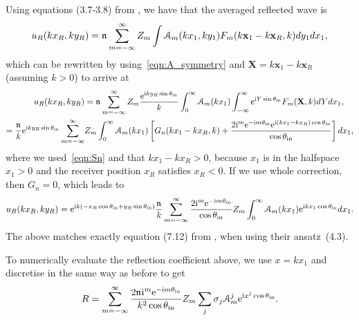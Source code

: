 \documentclass[12pt, a4paper]{article}
\begin{document}
Using equations (3.7-3.8) from \cite{gower_reflection_2018}, we have that the averaged reflected wave is
\begin{equation}
  u_R(kx_R,ky_R) = \mathfrak n_{} \sum_{m=-\infty}^\infty Z_m \int \mathcal A_m(kx_1,ky_1) F_m(k\mathbf x_1 - k\mathbf x_R,k) dy_1 dx_1,
\end{equation}
which can be rewritten by using~\eqref{eqn:A_symmetry} and $\mathbf X = k\mathbf x_1 - k\mathbf x_R$ (assuming $k>0$) to arrive at
\begin{align}
  u_R(kx_R,ky_R) &= \mathfrak n_{} \sum_{m=-\infty}^\infty Z_m \frac{\textrm{e}^{ \textrm{i} k y_R \sin \theta_{\mathrm{in}}}}{k} \int_{0}^\infty \mathcal A_m(kx_1) \int_{-\infty}^\infty \textrm{e}^{ \textrm{i} Y \sin \theta_{\mathrm{in}}} F_m(\mathbf X,k) dY dx_1,
  \\ \notag
   =  \frac{\mathfrak n_{}}{k} \textrm{e}^{ \textrm{i} k y_R \sin \theta_{\mathrm{in}}} \sum_{m=-\infty}^\infty &Z_m \int_{0}^\infty \mathcal A_m(kx_1) \left [ G_n(kx_1 - k x_R, k) + \frac{2 \textrm{i}^m \textrm{e}^{-\textrm{i} m \theta_{\mathrm{in}}} \textrm{e}^{\textrm{i} (kx_1 - k x_R) \cos \theta_{\mathrm{in}}}}{\cos \theta_{\mathrm{in}}} \right] d x_1,
\end{align}
where we used~\eqref{eqn:Sn} and that $kx_1 - k x_R > 0$, because $x_1$ is in the halfspace $x_1 >0$ and the receiver position $x_R$ satisfies $x_R<0$. If we use whole correction, then $G_n = 0$, which leads to
\begin{equation}
  u_R(kx_R,ky_R) =   \textrm{e}^{ \textrm{i} k ( - x_R \cos \theta_{\mathrm{in}} + y_R \sin \theta_{\mathrm{in}} )} \frac{\mathfrak n_{}}{k} \sum_{m=-\infty}^\infty \frac{2 \textrm{i}^m \textrm{e}^{-\textrm{i} m \theta_{\mathrm{in}}}}{\cos \theta_{\mathrm{in}}} Z_m  \int_{0}^\infty \mathcal A_m(kx_1) \textrm{e}^{\textrm{i} k x_1 \cos \theta_{\mathrm{in}}}  d x_1.
\end{equation}
The above matches exactly equation (7.12) from \cite{gower_reflection_2018}, when using their ansatz~(4.3).

To numerically evaluate the reflection coefficient above, we use $x = k x_1$ and discretise in the same way as before to get
\begin{equation}
  R =   \sum_{m=-\infty}^\infty \frac{2 \mathfrak n_{} \textrm{i}^m \textrm{e}^{-\textrm{i} m \theta_{\mathrm{in}}}}{k^2 \cos \theta_{\mathrm{in}}} Z_m  \sum_{j} \sigma_j \mathcal A_m^j \textrm{e}^{\textrm{i} x^j \cos \theta_{\mathrm{in}}}.
\end{equation}

\printbibliography

% 
% 
\end{document}
